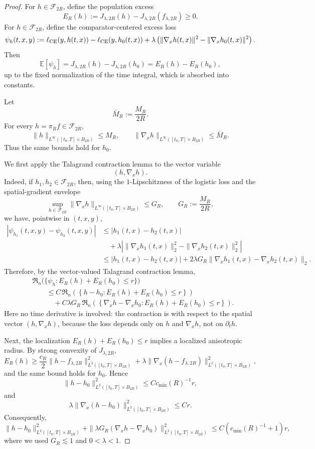 \documentclass[11pt]{article}
\theoremstyle{plain}
\theoremstyle{definition}
\theoremstyle{remark}
\begin{document}
\begin{proof}
For \(h\in\mathcal F_{2R}\), define the population excess
\[
E_R(h):=J_{\lambda,2R}(h)-J_{\lambda,2R}(f_{\lambda,2R})\ge0.
\]
For \(h\in\mathcal F_{2R}\), define the comparator-centered excess loss
\[
\psi_h(t,x,y):=
\ell_{\rm CE}(y,h(t,x))
-
\ell_{\rm CE}(y,h_0(t,x))
+
\lambda
\left(
\|\nabla_xh(t,x)\|^2
-
\|\nabla_xh_0(t,x)\|^2
\right).
\]
Then
\[
\mathbb E[\psi_h]
=
J_{\lambda,2R}(h)-J_{\lambda,2R}(h_0)
=
E_R(h)-E_R(h_0),
\]
up to the fixed normalization of the time integral, which is absorbed into
constants.

Let
\[
\bar M_R:=\frac{M_R}{2R}.
\]
For every \(h=\pi_R f\in\mathcal F_{2R}\),
\[
\|h\|_{L^\infty([t_0,T]\times B_{2R})}\le M_R,
\qquad
\|\nabla_xh\|_{L^\infty([t_0,T]\times B_{2R})}\le \bar M_R.
\]
Thus the same bounds hold for \(h_0\).

We first apply the Talagrand contraction lemma to the vector variable
\[
(h,\nabla_x h).
\]
Indeed, if \(h_1,h_2\in\mathcal F_{2R}\), then, using the
\(1\)-Lipschitzness of the logistic loss and the spatial-gradient envelope
\[
\sup_{h\in\mathcal F_{2R}}
\|\nabla_xh\|_{L^\infty([t_0,T]\times B_{2R})}
\le
G_R,
\qquad
G_R:=\frac{M_R}{2R},
\]
we have, pointwise in \((t,x,y)\),
\[
\begin{aligned}
|\psi_{h_1}(t,x,y)-\psi_{h_2}(t,x,y)|
&\le
|h_1(t,x)-h_2(t,x)|  \\
&\quad+
\lambda
\left|
\|\nabla_xh_1(t,x)\|_2^2
-
\|\nabla_xh_2(t,x)\|_2^2
\right|\\
&\le
|h_1(t,x)-h_2(t,x)|
+
2\lambda G_R
\|\nabla_xh_1(t,x)-\nabla_xh_2(t,x)\|_2.
\end{aligned}
\]
Therefore, by the vector-valued Talagrand contraction lemma,
\[
\begin{aligned}
&\mathfrak R_n
\bigl(
\{\psi_h:E_R(h)+E_R(h_0)\le r\}
\bigr)\\
&\qquad\le
C\,
\mathfrak R_n
\left(
\left\{
h-h_0:
E_R(h)+E_R(h_0)\le r
\right\}
\right)\\
&\qquad\quad+
C\lambda G_R\,
\mathfrak R_n
\left(
\left\{
\nabla_xh-\nabla_xh_0:
E_R(h)+E_R(h_0)\le r
\right\}
\right).
\end{aligned}
\]
Here no time derivative is involved: the contraction is with respect to
the spatial vector \((h,\nabla_xh)\), because the loss depends only on
\(h\) and \(\nabla_xh\), not on \(\partial_t h\).

Next, the localization \(E_R(h)+E_R(h_0)\le r\) implies a localized
anisotropic radius. By strong convexity of \(J_{\lambda,2R}\),
\[
E_R(h)
\ge
\frac{c_R}{2}\|h-f_{\lambda,2R}\|_{L^2([t_0,T]\times B_{2R})}^2
+
\lambda
\|\nabla_x(h-f_{\lambda,2R})\|_{L^2([t_0,T]\times B_{2R})}^2,
\]
and the same bound holds for \(h_0\). Hence
\[
\|h-h_0\|_{L^2([t_0,T]\times B_{2R})}^2
\le
C c_{\min}(R)^{-1}r,
\]
and
\[
\lambda
\|\nabla_x(h-h_0)\|_{L^2([t_0,T]\times B_{2R})}^2
\le
Cr.
\]
Consequently,
\[
\|h-h_0\|_{L^2([t_0,T]\times B_{2R})}^2
+
\|\lambda G_R(\nabla_xh-\nabla_xh_0)\|_{L^2([t_0,T]\times B_{2R})}^2
\le
C(c_{\min}(R)^{-1}+1)r,
\]
where we used \(G_R\lesssim1\) and \(0<\lambda<1\).


\end{proof}
\end{document}
